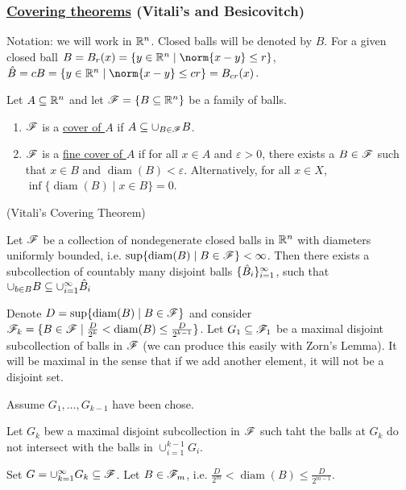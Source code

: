 \documentclass[x11names,reqno,14pt]{extarticle}
\newcommand{\seq}[2][\oo]{_{#2 = 1}^#1}
\newcommand{\cupk}[1][\oo]{\cup\seq[#1]{k}}
\newcommand{\cupi}[1][\oo]{\cup\seq[#1]{i}}
\DeclareMathOperator{\diam}{diam}
\begin{document}
\subsubsection*{\underline{Covering theorems} (Vitali's and Besicovitch)}

Notation: we will work in $\mathbb{R}^n$. Closed balls will be denoted by $B$. For a given closed ball $B = B_r(x) = \{y\in\R^n \mid \norm{x - y} \leq r\}$, $\hat{B} = cB = \{y\in\R^n \mid \norm{x - y} \leq cr\} = B_{cr}(x)$. 


Let $A \subseteq \mathbb{R}^n$ and let $\mathscr{F} = \{B\subseteq\mathbb{R}^n\}$ be a family of balls. 
\begin{enumerate}
\item $\mathscr{F}$ is a \underline{cover of $A$} if $A \subseteq \cup_{B\in\mathscr{F}}B$. 

\item $\mathscr{F}$ is a \underline{fine cover of $A$} if for all $x \in A$ and $\varepsilon>0$, there exists a $B\in\mathscr{F}$ such that $x \in B$ and $\diam(B) < \varepsilon$. Alternatively, for all $x \in X$, $\inf\{\diam(B) \mid x \in B\} = 0$. 

\end{enumerate}

\thm (Vitali's Covering Theorem)

Let $\mathscr{F}$ be a collection of nondegenerate closed balls in $\mathbb{R}^n$ with diameters uniformly bounded, i.e. $\sup\{\diam(B) \mid B \in \ms{F}\} < \oo$. Then there exists a subcollection of countably many disjoint balls $\{\hat{B}_i\}\seq{i}$, such that $\cup_{b\in B}B \subseteq \cupi\hat{B}_i$

\proof 

Denote $D = \sup\{\diam(B) \mid B \in \ms{F}\}$ and consider $\ms{F}_k = \{B\in\ms{F}\mid\frac{D}{2^k} < \diam(B) \leq \frac{D}{2^{k - 1}}\}$. Let $G_1 \subseteq \mathscr{F}_1$ be a maximal disjoint subcollection of balls in $\mathscr{F}$ (we can produce this easily with Zorn's Lemma). It will be maximal in the sense that if we add another element, it will not be a disjoint set. 

Assume $G_1, \dots, G_{k - 1}$ have been chose. 

Let $G_k$ bew a maximal disjoint subcollection in $\mathscr{F}$ such taht the balls at $G_k$ do not intersect with the balls in $\cup_{i=1}^{k - 1}G_i$.

Set $G = \cupk G_k \subseteq \ms{F}$. Let $B \in \mathscr{F}_m$, i.e. $\frac{D}{2^m} < \diam(B) \leq \frac{D}{2^{m - 1}}$. 
\end{document}
